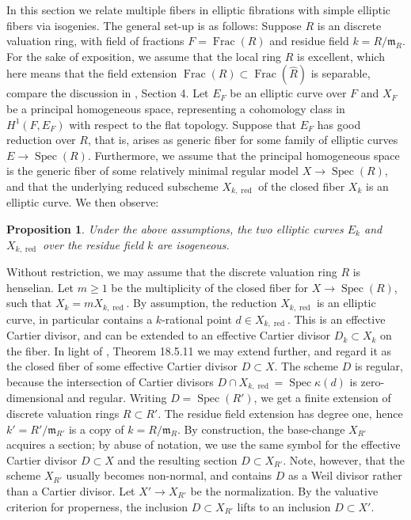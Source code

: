 \documentclass[oneside, 12pt]{amsart}
\newcommand\mylabel[1]{\label{#1}\marginpar{\vspace{-1ex}\medskip\medskip\footnotesize \tt #1}}
\renewcommand\mylabel[1]{\label{#1}}
\newtheorem{proposition}[theorem]{Proposition}
\theoremstyle{definition}
\theoremstyle{remark}
\newcommand{\Frac}{\operatorname{Frac}}
\newcommand{\maxid}{\mathfrak{m}}
\newcommand{\ra}{\rightarrow}
\newcommand{\red}{{\operatorname{red}}}
\newcommand{\Spec}{\operatorname{Spec}}
\begin{document}
In this section we relate  multiple   fibers in elliptic fibrations with simple elliptic fibers
via isogenies. The general  set-up is as follows: Suppose $R$ is an   discrete valuation ring,
with field of fractions $F=\Frac(R)$ and residue field $k=R/\maxid_R$. For the sake of exposition,
we assume that  the local ring $R$ is excellent, which here means that the field extension $\Frac(R)\subset\Frac(\hat{R})$
is separable, compare the discussion in \cite{Schroeer 2020}, Section 4.
Let $E_F$ be an elliptic curve over $F$ and $X_F$ be a principal homogeneous space,
representing a cohomology class in $H^1(F,E_F)$ with respect to the   flat topology.
Suppose that $E_F$ has good reduction over $R$, that is,   arises as generic fiber for some
family of elliptic curves $E\ra\Spec(R)$.
Furthermore, we assume that the principal homogeneous space is the generic fiber of some relatively minimal regular model
$X\ra\Spec(R)$, and that the underlying reduced subscheme $X_{k,\red}$  of the closed
fiber $X_k$ is an elliptic curve. We then observe:

\begin{proposition}
\mylabel{reduction isogeneous}
Under the above assumptions, the two elliptic curves $E_k$ and $X_{k,\red}$ over the residue field $k$ are isogeneous.
\end{proposition}

\proof
Without restriction, we may assume that the discrete valuation ring $R$ is henselian.
Let $m\geq 1$ be the multiplicity of the closed fiber for $X\ra\Spec(R)$, such
that $X_k=mX_{k,\red}$. By assumption, the reduction $X_{k,\red}$ is an elliptic curve,  in particular contains a
$k$-rational point $d\in X_{k,\red}$. This is an effective Cartier divisor,
and can be extended to an effective Cartier divisor $D_k\subset X_k$ on the   fiber.
In light of \cite{EGA IVd}, Theorem 18.5.11 we may extend further, and regard it as the closed
fiber of some effective Cartier divisor $D\subset X$.
The scheme $D$ is regular, because the intersection of Cartier divisors $D\cap X_{k,\red}=\Spec \kappa(d)$
is  zero-dimensional and regular. Writing $D=\Spec(R')$, we get a finite extension of discrete valuation rings
$R\subset R'$. The residue field extension has degree one, hence $k'=R'/\maxid_{R'}$ is a copy of $k=R/\maxid_R$.
By construction, the base-change $X_{R'}$
acquires a section;  by abuse of notation, we use the same symbol for the
effective Cartier divisor $D\subset X$ and the resulting section $D\subset X_{R'}$.
Note, however, that the scheme $X_{R'}$   usually becomes non-normal, and contains $D$
as a Weil divisor rather than a Cartier divisor.
Let $X'\ra X_{R'}$ be the normalization. By the valuative criterion for properness,
the inclusion $D\subset X_{R'}$ lifts to an inclusion $D\subset X'$.
\end{document}
